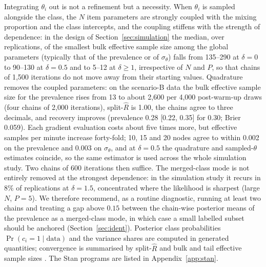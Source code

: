 Integrating $\theta_i$ out is not a refinement but a necessity. When $\theta_i$ is
sampled alongside the class, the $N$ item parameters are strongly coupled with the mixing
proportion and the class intercepts, and the coupling stiffens with the strength of
dependence: in the design of Section~\ref{sec:simulation} the median, over replications,
of the smallest bulk effective sample size among the global parameters (typically that of
the prevalence or of $\sigma_\theta$) falls from 135--290 at $\delta = 0$ to 90--130 at
$\delta = 0.5$ and to 5--12 at $\delta \ge 1$, irrespective of $N$ and $P$, so that chains
of 1,500 iterations do not move away from their starting values. Quadrature removes the
coupled parameters: on the scenario-B data the bulk effective sample size for the
prevalence rises from 13 to about 2,600 per 4,000 post-warm-up draws (four chains of
2,000 iterations), split-$\widehat{R}$ is 1.00, the chains agree to three decimals, and
recovery improves (prevalence 0.28 [0.22, 0.35] for 0.30; Brier 0.059). Each gradient
evaluation costs about five times more, but effective samples per minute increase
forty-fold; 10, 15 and 20 nodes agree to within 0.002 on the prevalence and 0.003 on
$\sigma_\theta$, and at $\delta = 0.5$ the quadrature and sampled-$\theta$ estimates
coincide, so the same estimator is used across the whole simulation study. Two chains of
600 iterations then suffice. The merged-class mode is not entirely removed at the
strongest dependence: in the simulation study it recurs in 8\% of replications at
$\delta = 1.5$, concentrated where the likelihood is sharpest (large $N$, $P = 5$). We
therefore recommend, as a routine diagnostic, running at least two chains and treating a
gap above $0.15$ between the chain-wise posterior means of the prevalence as a
merged-class mode, in which case a small labelled subset should be anchored
(Section~\ref{sec:ident}). Posterior class probabilities $\Pr(c_i = 1 \mid \text{data})$ and
the variance shares are computed in generated quantities; convergence is summarised by
split-$\widehat{R}$ and bulk and tail effective sample sizes \citep{Vehtari2021}. The
Stan programs are listed in Appendix~\ref{app:stan}.

